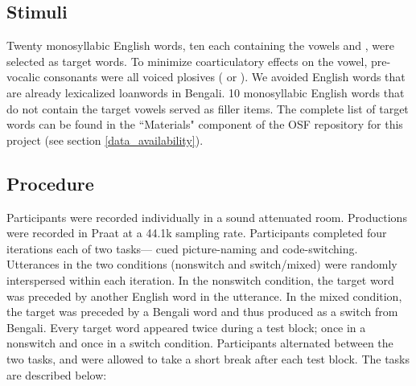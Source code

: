 \documentclass[12 pt]{article}
\newcommand{\nt}[1]{\textipa{[#1]}} %
\begin{document}
\subsection{Stimuli}
Twenty monosyllabic English words, ten each containing the vowels \nt{2} and \nt{\ae}, were selected as target words. To minimize coarticulatory effects on the vowel, pre-vocalic consonants were all voiced plosives (\nt{b} or \nt{d}). We avoided English words that are already lexicalized loanwords in Bengali. 10 monosyllabic English words that do not contain the target vowels served as filler items. The complete list of target words can be found in the ``Materials" component of the OSF repository for this project (see section \ref{data_availability}).



\subsection{Procedure} \label{procedure}
Participants were recorded individually in a sound attenuated room. Productions were recorded in Praat \citep{boersma2016praat} at a 44.1k sampling rate. Participants completed four iterations each of two tasks--- cued picture-naming and code-switching. Utterances in the two conditions (nonswitch and switch/mixed) were randomly interspersed within each iteration. In the nonswitch condition, the target word was preceded by another English word in the utterance. In the mixed condition, the target was preceded by a Bengali word and thus produced as a switch from Bengali. Every target word appeared twice during a test block; once in a nonswitch and once in a switch condition. Participants alternated between the two tasks, and were allowed to take a short break after each test block. The tasks are described below:
\end{document}
